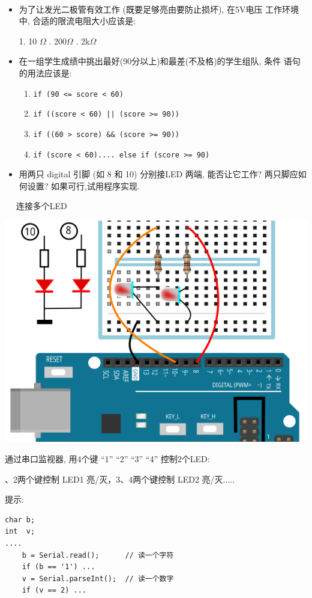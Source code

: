 \documentclass[a4paper,11pt]{seminar}
\begin{document}
~\ \vskip-16mm ~
\begin{itemize}
    \item 为了让发光二极管有效工作 (既要足够亮由要防止损坏), 在5V电压
        工作环境中, 合适的限流电阻大小应该是:

       1. 10 $\Omega$ \qquad{}. 200$\Omega$ \qquad{}. 2k$\Omega$

    \item 在一组学生成绩中挑出最好(90分以上)和最差(不及格)的学生组队, 条件
        语句的用法应该是:
    \begin{enumerate}
        \item \verb|if (90 <= score < 60)|
        \item \verb!if ((score < 60) || (score >= 90))!
        \item \verb|if ((60 > score) && (score >= 90))|
        \item \verb|if (score < 60).... else if (score >= 90)|
    \end{enumerate}
    \item 用两只 digital 引脚 (如 8 和 10) 分别接LED 两端, 能否让它工作?
        两只脚应如何设置? 如果可行,试用程序实现.
\end{itemize}

\endslide
{}
~\ \vskip-6mm 连接多个LED
\begin{center}
\includegraphics[width=.7\textwidth]{LED2}
\end{center}
\endslide

通过串口监视器, 用4个键 ``1''  ``2''  ``3''  ``4'' 控制2个LED:

、2两个键控制 LED1 亮/灭，3、4两个键控制 LED2 亮/灭.....

提示:
\begin{lstlisting}
char b;
int  v;
....
    b = Serial.read();      // 读一个字符
    if (b == '1') ...
    v = Serial.parseInt();  // 读一个数字
    if (v == 2) ...
\end{lstlisting}
\endslide
\end{document}
